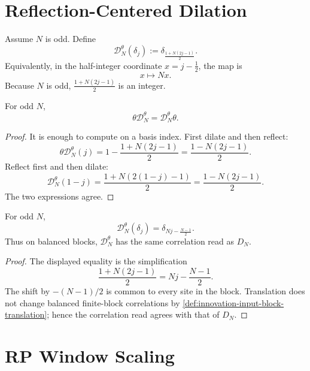 \section{Reflection-Centered Dilation}
\label{sec:innovation-input-reflection-centered-dilation}

\begin{definition}
\label{def:innovation-input-reflection-centered-dilation}
Assume $N$ is odd. Define
$$
\mathcal D_N^\theta(\delta_j)
:=
\delta_{\frac{1+N(2j-1)}2}.
$$
Equivalently, in the half-integer coordinate $x=j-\frac12$, the map is
$$
x\mapsto Nx.
$$
Because $N$ is odd, $\frac{1+N(2j-1)}2$ is an integer.
\end{definition}

\begin{lemma}
\label{lem:innovation-input-reflection-centered-dilation-commutes}
For odd $N$,
$$
\theta\mathcal D_N^\theta
=
\mathcal D_N^\theta\theta.
$$
\end{lemma}

\begin{proof}
It is enough to compute on a basis index. First dilate and then reflect:
$$
\theta\mathcal D_N^\theta(j)
=
1-\frac{1+N(2j-1)}2
=
\frac{1-N(2j-1)}2.
$$
Reflect first and then dilate:
$$
\mathcal D_N^\theta(1-j)
=
\frac{1+N(2(1-j)-1)}2
=
\frac{1-N(2j-1)}2.
$$
The two expressions agree.
\end{proof}

\begin{lemma}
\label{lem:innovation-input-reflection-centered-dilation-translation}
For odd $N$,
$$
\mathcal D_N^\theta(\delta_j)
=
\delta_{Nj-\frac{N-1}{2}}.
$$
Thus on balanced blocks, $\mathcal D_N^\theta$ has the same correlation
read as $D_N$.
\end{lemma}

\begin{proof}
The displayed equality is the simplification
$$
\frac{1+N(2j-1)}2
=
Nj-\frac{N-1}{2}.
$$
The shift by $-(N-1)/2$ is common to every site in the block. Translation
does not change balanced finite-block correlations by
\autoref{def:innovation-input-block-translation}; hence the correlation
read agrees with that of $D_N$.
\end{proof}

\section{RP Window Scaling}
\label{sec:innovation-input-rp-window-scaling}

